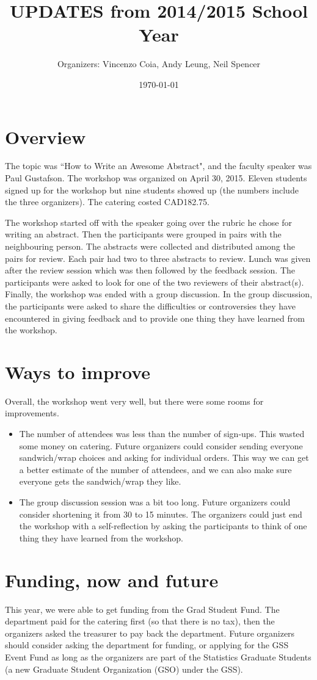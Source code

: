 \documentclass[11pt,a4paper]{article}
\title{UPDATES from 2014/2015 School Year}
\author{Organizers: Vincenzo Coia, Andy Leung, Neil Spencer}
\date{\today}
\begin{document}
\maketitle

\section{Overview}


The topic was ``How to Write an Awesome Abstract", and the faculty speaker was Paul Gustafson. The workshop was organized on April 30, 2015. Eleven students signed up for the workshop but nine students showed up (the numbers include the three organizers). The catering costed CAD182.75. 

The workshop started off with the speaker going over the rubric he chose for writing an abstract. Then the participants were grouped in pairs with the neighbouring person. The abstracts were collected and distributed among the pairs for review. Each pair had two to three abstracts to review. Lunch was given after the review session which was then followed by the feedback session. The participants were asked to look for one of the two reviewers of their abstract(s). Finally, the workshop was ended with a group discussion. In the group discussion, the participants were asked to share the difficulties or controversies they have encountered in giving feedback and to provide one thing they have learned from the workshop. 


\section{Ways to improve}

Overall, the workshop went very well, but there were some rooms for improvements.
\begin{itemize}
\item The number of attendees was less than the number of sign-ups. This wasted some money on catering. Future organizers could consider sending everyone sandwich/wrap choices and asking for individual orders. This way we can get a better estimate of the number of attendees, and we can also make sure everyone gets the sandwich/wrap they like.
\item The group discussion session was a bit too long. Future organizers could consider shortening it from 30 to 15 minutes. The organizers could just end the workshop with a self-reflection by asking the participants to think of one thing they have learned from the workshop. 
\end{itemize}

\section{Funding, now and future}

This year, we were able to get funding from the Grad Student Fund. The department paid for the catering first (so that there is no tax), then the organizers asked the treasurer to pay back the department. Future organizers should consider asking the department for funding, or applying for the GSS Event Fund as long as the organizers are part of the Statistics Graduate Students (a new Graduate Student
Organization (GSO) under the GSS).
\end{document}
